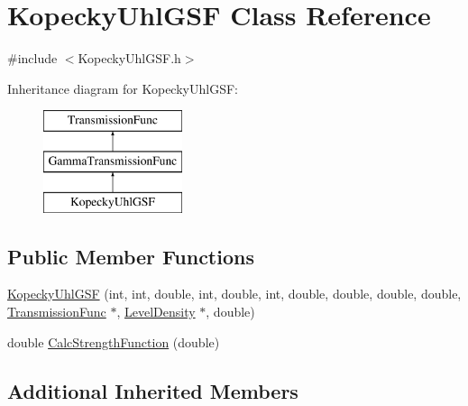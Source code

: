 \hypertarget{classKopeckyUhlGSF}{\section{Kopecky\-Uhl\-G\-S\-F Class Reference}
\label{classKopeckyUhlGSF}
}


{\ttfamily \#include $<$Kopecky\-Uhl\-G\-S\-F.\-h$>$}

Inheritance diagram for Kopecky\-Uhl\-G\-S\-F\-:\begin{figure}[H]
\begin{center}
\leavevmode
\includegraphics[height=3.000000cm]{d1/df2/classKopeckyUhlGSF}
\end{center}
\end{figure}
\subsection*{Public Member Functions}
\begin{DoxyCompactItemize}
\item 
\hyperlink{classKopeckyUhlGSF_a6d18795b6306d3bd01c9d7b097de2f3c}{Kopecky\-Uhl\-G\-S\-F} (int, int, double, int, double, int, double, double, double, double, \hyperlink{classTransmissionFunc}{Transmission\-Func} $\ast$, \hyperlink{classLevelDensity}{Level\-Density} $\ast$, double)
\item 
double \hyperlink{classKopeckyUhlGSF_acc719c087bb05ab9cc679c07d887b3ad}{Calc\-Strength\-Function} (double)
\end{DoxyCompactItemize}
\subsection*{Additional Inherited Members}


